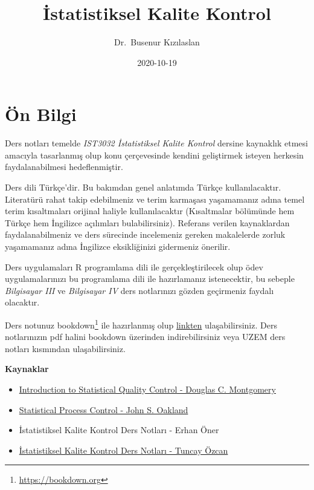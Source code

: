 \documentclass[
]{book}
\title{İstatistiksel Kalite Kontrol}
\author{Dr.~Busenur Kızılaslan}
\date{2020-10-19}
\begin{document}
\maketitle

{
\setcounter{tocdepth}{1}
\tableofcontents
}
\hypertarget{uxf6n-bilgi}{%
\chapter{Ön Bilgi}\label{uxf6n-bilgi}}

Ders notları temelde \emph{IST3032 İstatistiksel Kalite Kontrol} dersine kaynaklık etmesi amacıyla tasarlanmış olup konu çerçevesinde kendini geliştirmek isteyen herkesin faydalanabilmesi hedeflenmiştir.

Ders dili Türkçe'dir. Bu bakımdan genel anlatımda Türkçe kullanılacaktır. Literatürü rahat takip edebilmeniz ve terim karmaşası yaşamamanız adına temel terim kısaltmaları orijinal haliyle kullanılacaktır (Kısaltmalar bölümünde hem Türkçe hem İngilizce açılımları bulabilirsiniz). Referans verilen kaynaklardan faydalanabilmeniz ve ders sürecinde incelemeniz gereken makalelerde zorluk yaşamamanız adına İngilizce eksikliğinizi gidermeniz önerilir.

Ders uygulamaları R programlama dili ile gerçekleştirilecek olup ödev uygulamalarınızı bu programlama dili ile hazırlamanız istenecektir, bu sebeple \emph{Bilgisayar III} ve \emph{Bilgisayar IV} ders notlarınızı gözden geçirmeniz faydalı olacaktır.

Ders notunuz bookdown\footnote{\url{https://bookdown.org}} ile hazırlanmış olup \href{https://busenurk.github.io/quality-control/_book/index.html}{linkten} ulaşabilirsiniz. Ders notlarınızın pdf halini bookdown üzerinden indirebilirsiniz veya UZEM ders notları kısmından ulaşabilirsiniz.

\textbf{Kaynaklar}

\begin{itemize}
\item
  \href{http://endustri.eskisehir.edu.tr/ipoyraz/TKY302/icerik/text\%20book_montgomery_6th\%20edition.pdf}{Introduction to Statistical Quality Control - Douglas C. Montgomery}
\item
  \href{http://www.diliev.com/Home/materiali/KHEA/referati/6812268-Statistical-Process-Control-eBook-VG.pdf}{Statistical Process Control - John S. Oakland}
\item
  İstatistiksel Kalite Kontrol Ders Notları - Erhan Öner
\item
  \href{http://auzefkitap.istanbul.edu.tr/kitap/endustrimuhlt_ue/istatistikselkalitekontrolu.pdf}{İstatistiksel Kalite Kontrol Ders Notları - Tuncay Özcan}
\end{itemize}
\end{document}
